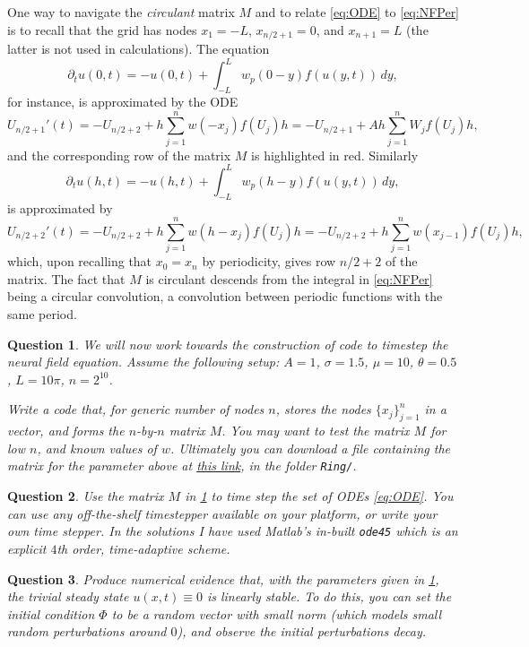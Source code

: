 \documentclass[a4paper]{siamonline220329}
\theoremstyle{plain}
\newtheorem{question}{Question}
\begin{document}
One way to navigate the \textit{circulant} matrix $M$ and to relate \cref{eq:ODE} to
\cref{eq:NFPer} is to
recall that the grid has nodes $x_1=-L$, $x_{n/2+1} = 0$, and $x_{n+1}=L$ (the latter
is not used in calculations). The equation
\[
 \partial_{t}u(0,t) = -u(0,t) + \int_{-L}^Lw_p(0-y)f(u(y,t))\, dy,
\]
for instance, is approximated by the ODE
\[
  U_{n/2+1}'(t) = -U_{n/2+2} + h \sum_{j=1}^n w(-x_j) f(U_j) h
                = -U_{n/2+1} + Ah \sum_{j=1}^n W_jf(U_j) h,
\]
and the corresponding row of the matrix $M$ is highlighted in red. Similarly
\[
 \partial_{t}u(h,t) = -u(h,t) + \int_{-L}^Lw_p(h-y)f(u(y,t))\, dy,
\]
is approximated by
\[
  U_{n/2+2}'(t) = -U_{n/2+2} + h \sum_{j=1}^n w(h-x_j) f(U_j) h
                = -U_{n/2+2} + h \sum_{j=1}^n w(x_{j-1}) f(U_j) h,
\]
which, upon recalling that $x_0=x_n$ by periodicity, gives row $n/2+2$ of the matrix.
The fact that $M$ is circulant descends from the integral in \cref{eq:NFPer} being
a circular convolution, a convolution between periodic functions with the same period.

\begin{question} \label{question:codeMatrix}
  We will now work towards the construction of code to timestep the neural field
  equation. Assume the following setup: $A = 1$, $\sigma=1.5$, $\mu =10$,
  $\theta = 0.5$, $L = 10\pi$, $n = 2^{10}$.

  Write a code that, for generic number of nodes $n$, stores the nodes
  $\{x_j\}_{j=1}^n$ in a vector, and forms the $n$-by-$n$ matrix $M$. You may want to
  test the matrix $M$ for low $n$, and known values of $w$. Ultimately you can
  download a file containing the matrix for the parameter above at 
  \href{https://zenodo.org/records/11120604}{this link}, in the folder
  \texttt{Ring/}.
\end{question}

\begin{question} 
  Use the matrix $M$ in \cref{question:codeMatrix} to time step the set of ODEs
  \cref{eq:ODE}. You can use any off-the-shelf timestepper available on your
  platform, or write your own time stepper. In the solutions I have used Matlab's in-built
  \texttt{ode45} which is an explicit $4$th order, time-adaptive scheme.
\end{question}

\begin{question} 
  Produce numerical evidence that, with the parameters given in
  \cref{question:codeMatrix}, the trivial steady state $u(x,t) \equiv 0$ is linearly
  stable. To do this, you can set the initial condition $\Phi$ to be a random vector
  with small norm (which models small random perturbations around $0$), and observe the
  initial perturbations decay.
\end{question}
\end{document}
